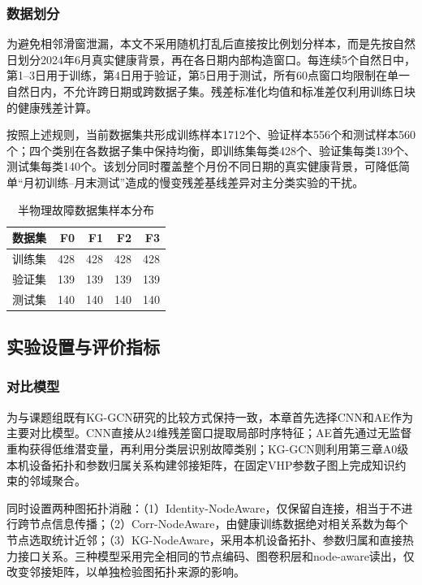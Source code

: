 \subsubsection{数据划分}

为避免相邻滑窗泄漏，本文不采用随机打乱后直接按比例划分样本，而是先按自然日划分2024年6月真实健康背景，再在各日期内部构造窗口。每连续5个自然日中，第1--3日用于训练，第4日用于验证，第5日用于测试，所有60点窗口均限制在单一自然日内，不允许跨日期或跨数据子集。残差标准化均值和标准差仅利用训练日块的健康残差计算。

按照上述规则，当前数据集共形成训练样本1712个、验证样本556个和测试样本560个；四个类别在各数据子集中保持均衡，即训练集每类428个、验证集每类139个、测试集每类140个。该划分同时覆盖整个月份不同日期的真实健康背景，可降低简单“月初训练--月末测试”造成的慢变残差基线差异对主分类实验的干扰。

\begin{table}[htbp]
    \centering
    \caption{半物理故障数据集样本分布}
    \label{tab:fault_dataset_split_v2}
    \begin{tabular}{lrrrr}
        \toprule
        数据集 & F0 & F1 & F2 & F3 \\
        \midrule
        训练集 & 428 & 428 & 428 & 428 \\
        验证集 & 139 & 139 & 139 & 139 \\
        测试集 & 140 & 140 & 140 & 140 \\
        \bottomrule
    \end{tabular}
\end{table}

\subsection{实验设置与评价指标}
\label{subsec:experiment_setting_v2}

\subsubsection{对比模型}

为与课题组既有KG-GCN研究的比较方式保持一致，本章首先选择CNN和AE作为主要对比模型\cite{YangHaodong2026CFB}。CNN直接从24维残差窗口提取局部时序特征；AE首先通过无监督重构获得低维潜变量，再利用分类层识别故障类别；KG-GCN则利用第三章A0级本机设备拓扑和参数归属关系构建邻接矩阵，在固定VHP参数子图上完成知识约束的邻域聚合。

同时设置两种图拓扑消融：（1）Identity-NodeAware，仅保留自连接，相当于不进行跨节点信息传播；（2）Corr-NodeAware，由健康训练数据绝对相关系数为每个节点选取统计近邻；（3）KG-NodeAware，采用本机设备拓扑、参数归属和直接热力接口关系。三种模型采用完全相同的节点编码、图卷积层和node-aware读出，仅改变邻接矩阵，以单独检验图拓扑来源的影响。

